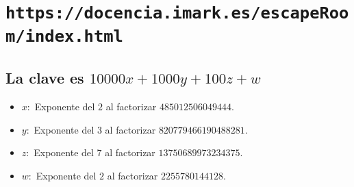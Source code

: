 \documentclass[a4paper,12pt]{article}
\begin{document}
\section*{\texttt{https://docencia.imark.es/escapeRoom/index.html}}
\subsection*{La clave es $10000x + 1000y + 100z +w$}
\begin{itemize}
	\item $x:$ Exponente del $2$ al factorizar $485012506049444$.
	\item $y:$ Exponente del $3$ al factorizar $820779466190488281$.
	\item $z:$ Exponente del $7$ al factorizar $13750689973234375$.
	\item $w:$ Exponente del $2$ al factorizar $2255780144128$.
\end{itemize}
\end{document}
